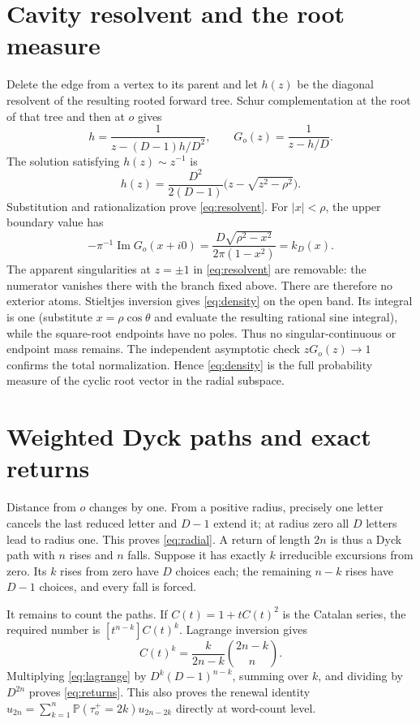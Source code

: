 \documentclass[10pt]{article}
\theoremstyle{remark}
\newcommand{\Pp}{\mathbb P}
\newcommand{\1}{\mathsf{1}}
\begin{document}
\section{Cavity resolvent and the root measure}

Delete the edge from a vertex to its parent and let $h(z)$ be the diagonal
resolvent of the resulting rooted forward tree.  Schur complementation at
the root of that tree and then at $o$ gives
\begin{equation}
 h=\frac1{z-(D-1)h/D^2},\qquad
 G_o(z)=\frac1{z-h/D}.                                    \label{eq:cavity}
\end{equation}
The solution satisfying $h(z)\sim z^{-1}$ is
\[
 h(z)=\frac{D^2}{2(D-1)}\bigl(z-\sqrt{z^2-\rho^2}\bigr).
\]
Substitution and rationalization prove \eqref{eq:resolvent}.  For
$|x|<\rho$, the upper
boundary value has
\[
 -\pi^{-1}\operatorname{Im}G_o(x+i0)
 =\frac{D\sqrt{\rho^2-x^2}}{2\pi(1-x^2)}=k_D(x).
\]
The apparent singularities at $z=\pm1$ in \eqref{eq:resolvent} are removable:
the numerator
vanishes there with the branch fixed above.  There are therefore no exterior
atoms.  Stieltjes inversion gives \eqref{eq:density} on the open band.
Its integral is one (substitute $x=\rho\cos\theta$ and evaluate the resulting
rational sine integral), while the square-root endpoints have no poles.
Thus no singular-continuous or endpoint mass remains.  The independent
asymptotic check $zG_o(z)\to1$ confirms the total normalization.  Hence
\eqref{eq:density} is the full probability measure of the cyclic root vector
in the radial subspace.

\section{Weighted Dyck paths and exact returns}

Distance from $o$ changes by one.  From a positive radius, precisely one
letter cancels the last reduced letter and $D-1$ extend it; at radius zero
all $D$ letters lead to radius one.  This proves \eqref{eq:radial}.  A return of length
$2n$ is thus a Dyck path with $n$ rises and $n$ falls.  Suppose it has
exactly $k$ irreducible excursions from zero.  Its $k$ rises from zero have
$D$ choices each; the remaining $n-k$ rises have $D-1$ choices, and every
fall is forced.

It remains to count the paths.  If $C(t)=1+tC(t)^2$ is the Catalan series,
the required number is $[t^{n-k}]C(t)^k$.  Lagrange inversion gives
\begin{equation}
 [t^{n-k}]C(t)^k=\frac{k}{2n-k}\binom{2n-k}{n}.            \label{eq:lagrange}
\end{equation}
Multiplying \eqref{eq:lagrange} by $D^k(D-1)^{n-k}$, summing over $k$, and
dividing by $D^{2n}$ proves \eqref{eq:returns}.  This also proves the renewal identity
$u_{2n}=\sum_{k=1}^n\Pp(\tau_o^+=2k)u_{2n-2k}$ directly at word-count level.
\end{document}
